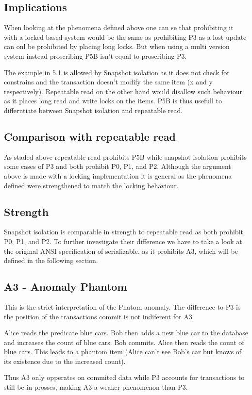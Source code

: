 \documentclass[sigconf, review=true]{acmart}
\begin{document}
\subsection{Implications}
When looking at the phenomena defined above one can se that prohibiting it with a locked based system
would be the same as prohibiting P3 as a lost update can onl be prohibited by placing long locks.
But when using a multi version system instead proscribing P5B isn't equal to proscribing P3.

The example in 5.1 is allowed by Snapshot isolation as it does not check for constrains and the transaction
doesn't modify the same item (x and y respectively). Repeatable read on the other hand would disallow such
behaviour as it places long read and write locks on the items.
P5B is thus usefull to differntiate between Snapshot isolation and repeatable read.
\subsection{Comparison with repeatable read}
As staded above repeatable read prohibits P5B while snapshot isolation prohibits some cases of
P3 and both prohibit P0, P1, and P2. Although the argument above is made with a locking implementation
it is general as the phenomena defined were strengthened to match the locking behaviour.
\subsection{Strength}
Snapshot isolation is comparable in strength to repeatable read as both prohibit P0, P1, and P2.
To further investigate their difference we have to take a look at the original ANSI specification of serializable,
as it prohibits A3, which will be defined in the following section.
\subsection{A3 - Anomaly Phantom}
This is the strict interpretation of the Phatom anomaly. The difference to P3 is the position of the
transactions commit is not indiferent for A3.
\begin{example}
    Alice reads the predicate blue cars. Bob then adds a new blue car to the database and increases
    the count of blue cars. Bob commits.  Alice then reads the count of blue cars. This leads to a phantom item
    (Alice can’t see Bob's car but knows of its existence due to the increased count).
\end{example}
Thus A3 only opperates on commited data while P3 accounts for transactions to still be in prosses,
making A3 a weaker phenomenon than P3.
\end{document}
